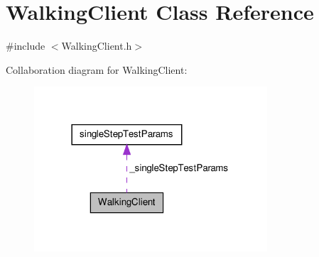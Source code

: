 \hypertarget{classWalkingClient}{\section{\-Walking\-Client \-Class \-Reference}
\label{classWalkingClient}
}


{\ttfamily \#include $<$\-Walking\-Client.\-h$>$}



\-Collaboration diagram for \-Walking\-Client\-:
\nopagebreak
\begin{figure}[H]
\begin{center}
\leavevmode
\includegraphics[width=246pt]{classWalkingClient__coll__graph}
\end{center}
\end{figure}

